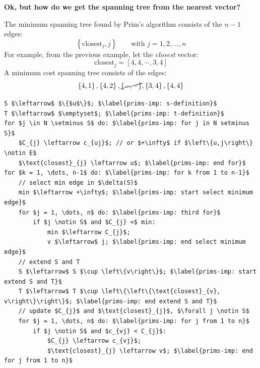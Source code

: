\noindent
\begin{flushleft}
    \textcolor{Green3}{ \textbf{Ok, but how do we get the spanning tree from the nearest vector?}}
\end{flushleft}
The minimum spanning tree found by Prim's algorithm consists of the $n-1$ edges:
\begin{equation*}
    \left\{\text{closest}_{j}, j\right\} \hspace{2em} \text{with } j = 1,2,\dots,n
\end{equation*}
For example, from the previous example, let the \emph{closest} vector:
\begin{equation*}
    \text{closest}_{j} = \left[4,4,-,3,4\right]
\end{equation*}
A minimum cost spanning tree consists of the edges:
\begin{equation*}
    \left\{4,1\right\}, \left\{4,2\right\}, \cancel{\left\{-,-\right\}}, \left\{3,4\right\}, \left\{4,4\right\}
\end{equation*}
\begin{lstlisting}[language=pseudo-code, caption={Minimum spanning tree (MST) problem: Prim's $O\left(n^{2}\right)$}]
S $\leftarrow$ $\{$u$\}$; $\label{prims-imp: s-definition}$
T $\leftarrow$ $\emptyset$; $\label{prims-imp: t-definition}$
for $j \in N \setminus S$ do: $\label{prims-imp: for j in N setminus S}$
    $C_{j} \leftarrow c_{uj}$; // or $+\infty$ if $\left\{u,j\right\} \notin E$
    $\text{closest}_{j} \leftarrow u$; $\label{prims-imp: end for}$
for $k = 1, \dots, n-1$ do: $\label{prims-imp: for k from 1 to n-1}$
    // select min edge in $\delta(S)$
    min $\leftarrow +\infty$; $\label{prims-imp: start select minimum edge}$
    for $j = 1, \dots, n$ do: $\label{prims-imp: third for}$
        if $j \notin S$ and $C_{j} <$ min:
            min $\leftarrow C_{j}$;
            v $\leftarrow$ j; $\label{prims-imp: end select minimum edge}$
    // extend S and T
    S $\leftarrow$ S $\cup \left\{v\right\}$; $\label{prims-imp: start extend S and T}$
    T $\leftarrow$ T $\cup \left\{\left\{\text{closest}_{v}, v\right\}\right\}$; $\label{prims-imp: end extend S and T}$
    // update $C_{j}$ and $\text{closest}_{j}$, $\forall j \notin S$
    for $j = 1, \dots, n$ do: $\label{prims-imp: for j from 1 to n}$
        if $j \notin S$ and $c_{vj} < C_{j}$:
            $C_{j} \leftarrow c_{vj}$;
            $\text{closest}_{j} \leftarrow v$; $\label{prims-imp: end for j from 1 to n}$
\end{lstlisting}
